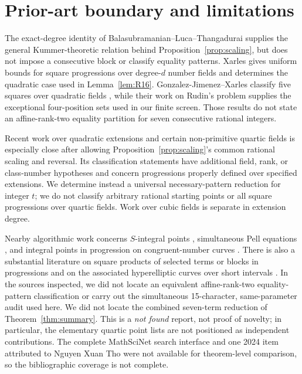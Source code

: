 \documentclass[11pt]{article}
\begin{document}
\section{Prior-art boundary and limitations}
The exact-degree identity of Balasubramanian--Luca--Thangadurai
\cite{BLT2010} supplies the general Kummer-theoretic relation behind
Proposition~\ref{prop:scaling}, but does not impose a consecutive block or
classify equality patterns. Xarles \cite{XarlesNF} gives uniform bounds for
square progressions over degree-$d$ number fields and determines the quadratic
case used in Lemma~\ref{lem:R16}. Gonzalez-Jimenez--Xarles classify five
squares over quadratic fields \cite{GJXFive}, while their work on Rudin's
problem \cite{GJXRudin} supplies the exceptional four-position sets used in
our finite screen. Those results do not state an affine-rank-two equality
partition for seven consecutive rational integers.

Recent work over quadratic extensions and certain non-primitive quartic fields
\cite{GJ2026,GJTho2026} is especially close after allowing
Proposition~\ref{prop:scaling}'s common rational scaling and reversal. Its
classification statements have additional field, rank, or class-number
hypotheses and concern progressions properly defined over specified
extensions. We determine instead a universal necessary-pattern reduction for
integer $t$; we do not classify arbitrary rational starting points or all
square progressions over quartic fields. Work over cubic fields
\cite{BremnerSiksek} is separate in extension degree.

Nearby algorithmic work concerns $S$-integral points
\cite{PethoEtAl}, simultaneous Pell equations \cite{MasserRickert},
and integral points in progression on congruent-number curves \cite{BST}.
There is also a substantial literature on square products of selected terms
or blocks in progressions and on the associated hyperelliptic curves over
short intervals
\cite{ErdosTurk,SaradhaProducts,GranvilleSelfridge,BBGH,BuiPrattZaharescu}.
In the sources inspected, we did not locate an equivalent affine-rank-two
equality-pattern classification or carry out the simultaneous 15-character,
same-parameter audit used here. We did not locate the combined seven-term
reduction of Theorem~\ref{thm:summary}. This is a \emph{not found} report,
not proof of novelty; in particular, the elementary quartic point lists are
not positioned as independent contributions. The complete MathSciNet search
interface and one 2024 item attributed to Nguyen Xuan Tho were not available
for theorem-level comparison, so the bibliographic coverage is not complete.
\end{document}
